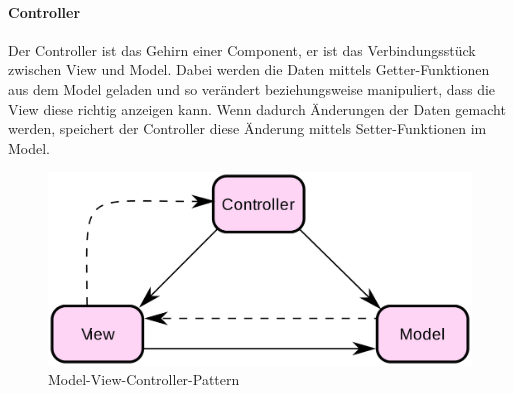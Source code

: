 \paragraph{Controller}
Der Controller ist das Gehirn einer Component, er ist das Verbindungsstück zwischen View und Model.
Dabei werden die Daten mittels Getter-Funktionen aus dem Model geladen und so verändert beziehungsweise manipuliert, dass die View diese richtig
anzeigen kann.
Wenn dadurch Änderungen der Daten gemacht werden, speichert der Controller diese Änderung mittels Setter-Funktionen im Model.

\begin{figure}[hbt!]
    \centering
    \includegraphics[scale=0.1]{pics/mvc_design_pattern}
    \caption{Model-View-Controller-Pattern}
    \label{fig:mvc_design_pattern}
\end{figure}
